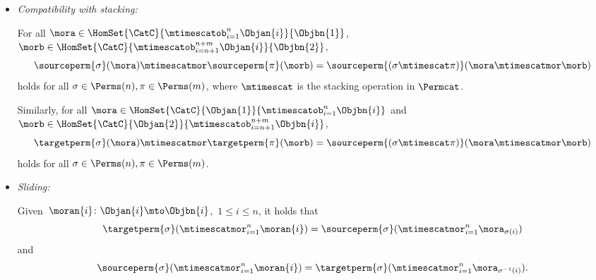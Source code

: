 \begin{ctdefinition}
\begin{itemize}
        \item \emph{Compatibility with stacking:}
            
            For all $\mora \in \HomSet{\CatC}{\mtimescatob_{i=1}^n \Objan{i}}{\Objbn{1}}$, $\morb \in \HomSet{\CatC}{\mtimescatob_{i=n+1}^{n+m} \Objan{i}}{\Objbn{2}}$,
\begin{equation}
 \sourceperm{\sigma}(\mora) \mtimescatmor \sourceperm{\pi}(\morb) =  \sourceperm{(\sigma \mtimescat \pi)}(\mora \mtimescatmor \morb) 
\end{equation}
holds for all $\sigma \in \Perms(n), \pi \in \Perms(m)$, where $\mtimescat$ is the stacking operation in $\Permcat$. 

Similarly, for all $\mora \in \HomSet{\CatC}{\Objan{1}}{\mtimescatob_{i=1}^n \Objbn{i}} $ and $\morb \in \HomSet{\CatC}{\Objan{2}}{\mtimescatob_{i=n+1}^{n+m} \Objbn{i}}$, 
\begin{equation}
 \targetperm{\sigma}(\mora) \mtimescatmor \targetperm{\pi}(\morb) =  \sourceperm{(\sigma \mtimescat \pi)}(\mora \mtimescatmor \morb) 
\end{equation}
holds for all $\sigma \in \Perms(n), \pi \in \Perms(m)$.
                   
          \item \emph{Sliding:}

              Given~$\moran{i} \colon \Objan{i} \mto \Objbn{i}$,~$1 \leq i \leq n$, it holds that
              \begin{equation}
                  \label{eq:perm-compatibility-with-stacking-1}
                  \targetperm{\sigma} ( \mtimescatmor_{i=1}^n \moran{i} ) = \sourceperm{\sigma}( \mtimescatmor_{i=1}^n \mora_{\sigma(i)} )
              \end{equation}
              and
              \begin{equation}
                  \label{eq:perm-compatibility-with-stacking-2}
                  \sourceperm{\sigma} ( \mtimescatmor_{i=1}^n \moran{i} ) = \targetperm{\sigma} ( \mtimescatmor_{i=1}^n \mora_{\sigma^{-1}(i)} ).
              \end{equation}

       
    \end{itemize}
\end{ctdefinition}



